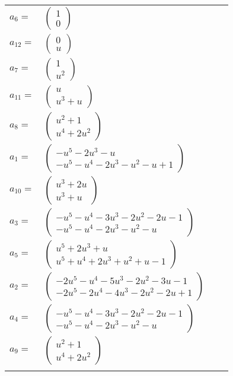 \documentclass[1p]{elsarticle_modified}
\theoremstyle{definition}
\begin{document}
\begin{tabular}{m{7pt} m{180pt} m{7pt} m{180pt} }
\flushright $a_{6}=$&$\begin{pmatrix}1\\0\end{pmatrix}$ \\
\flushright $a_{12}=$&$\begin{pmatrix}0\\u\end{pmatrix}$ \\
\flushright $a_{7}=$&$\begin{pmatrix}1\\u^2\end{pmatrix}$ \\
\flushright $a_{11}=$&$\begin{pmatrix}u\\u^3+u\end{pmatrix}$ \\
\flushright $a_{8}=$&$\begin{pmatrix}u^2+1\\u^4+2 u^2\end{pmatrix}$ \\
\flushright $a_{1}=$&$\begin{pmatrix}- u^5-2 u^3- u\\- u^5- u^4-2 u^3- u^2- u+1\end{pmatrix}$ \\
\flushright $a_{10}=$&$\begin{pmatrix}u^3+2 u\\u^3+u\end{pmatrix}$ \\
\flushright $a_{3}=$&$\begin{pmatrix}- u^5- u^4-3 u^3-2 u^2-2 u-1\\- u^5- u^4-2 u^3- u^2- u\end{pmatrix}$ \\
\flushright $a_{5}=$&$\begin{pmatrix}u^5+2 u^3+u\\u^5+u^4+2 u^3+u^2+u-1\end{pmatrix}$ \\
\flushright $a_{2}=$&$\begin{pmatrix}-2 u^5- u^4-5 u^3-2 u^2-3 u-1\\-2 u^5-2 u^4-4 u^3-2 u^2-2 u+1\end{pmatrix}$ \\
\flushright $a_{4}=$&$\begin{pmatrix}- u^5- u^4-3 u^3-2 u^2-2 u-1\\- u^5- u^4-2 u^3- u^2- u\end{pmatrix}$ \\
\flushright $a_{9}=$&$\begin{pmatrix}u^2+1\\u^4+2 u^2\end{pmatrix}$\\&\end{tabular}
\end{document}
